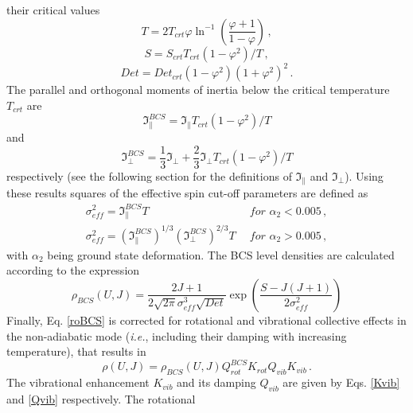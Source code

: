 \documentclass[twocolumn,amsmath,amssymb,10pt,groupedaddress,letter]{revtex4}
\begin{document}
their critical values
\begin{equation}
T=2T_{crt}\varphi\ln^{-1}\left(\frac{\varphi+1}{1-\varphi}\right)\,,\label{Tign}
\end{equation}
\begin{equation}
S=S_{crt}T_{crt}(1-\varphi^{2})/T\,,\label{Sign}
\end{equation}
\begin{equation}
Det=Det_{crt}(1-\varphi^{2})(1+\varphi^{2})^{2}\,.\label{Detign}
\end{equation}
The parallel and orthogonal moments of inertia below the critical
temperature $T_{crt}$ are
\begin{equation}
\Im_{\parallel}^{BCS}=\Im_{\parallel}T_{crt}(1-\varphi^{2})/T\label{momparign}
\end{equation}
and
\begin{equation}
\Im_{\perp}^{BCS}=\frac{1}{3}\Im_{\perp}+\frac{2}{3}\Im_{\perp}T_{crt}(1-\varphi^{2})/T\label{momortign}
\end{equation}
respectively (see the following section for the definitions of $\Im_{\parallel}$
and $\Im_{\perp}$). Using these results squares of the effective
spin cut-off parameters are defined as
\begin{equation}
\begin{array}{ll}
\sigma_{eff}^{2}=\Im_{\parallel}^{BCS}T & \,\,\, for\,\,\alpha_{2}<0.005\,,\\
\sigma_{eff}^{2}=\left(\Im_{\parallel}^{BCS}\right)^{1/3}\left(\Im_{\perp}^{BCS}\right)^{2/3}T & \,\,\, for\,\,\alpha_{2}>0.005\,,\end{array}\label{sigeffign}
\end{equation}
with $\alpha_{2}$ being ground state deformation. The BCS
level densities are calculated according to
the expression
\begin{equation}
\rho_{BCS}(U,J)=\frac{2J+1}{2\sqrt{2\pi}\sigma_{eff}^{3}\sqrt{Det}}\exp\left(\frac{S-J(J+1)}{2\sigma_{eff}^{2}}\right)\label{roBCS}
\end{equation}
 Finally, Eq. \ref{roBCS} is corrected for rotational and vibrational
collective effects in the non-adiabatic mode ({\it i.e.}, including their
damping with increasing temperature), that results in
\begin{equation}
\rho(U,J)=\rho_{BCS}(U,J)Q_{rot}^{BCS}K_{rot}Q_{vib}K_{vib}\,.\label{roBCScol}
\end{equation}
The vibrational enhancement $K_{vib}$ and its damping $Q_{vib}$
are given by Eqs. \ref{Kvib} and \ref{Qvib} respectively. The rotational
\end{document}
